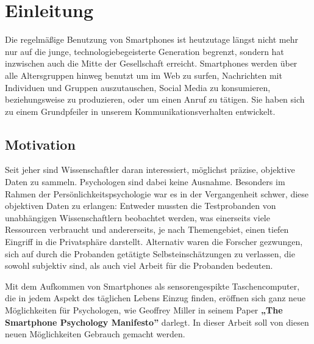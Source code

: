
\chapter{Einleitung}
\label{ch:Einleitung}

Die regelmäßige Benutzung von Smartphones ist heutzutage längst nicht mehr nur auf die junge, technologiebegeisterte Generation begrenzt,
sondern hat inzwischen auch die Mitte der Gesellschaft erreicht\cite{smartphonealter}.
Smartphones werden über alle Altersgruppen hinweg benutzt um im Web zu surfen, Nachrichten mit Individuen und Gruppen auszutauschen, Social Media zu konsumieren, beziehungsweise zu produzieren, oder um einen Anruf zu tätigen.
Sie haben sich zu einem Grundpfeiler in unserem Kommunikationsverhalten entwickelt.

\par



\section{Motivation}

Seit jeher sind Wissenschaftler daran interessiert, möglichst präzise, objektive Daten zu sammeln.
Psychologen sind dabei keine Ausnahme.
Besonders im Rahmen der Persönlichkeitspsychologie war es in der Vergangenheit schwer, diese objektiven Daten zu erlangen:
Entweder mussten die Testprobanden von unabhängigen Wissenschaftlern beobachtet werden,
was einerseits viele Ressourcen verbraucht und andererseits, je nach Themengebiet,
einen tiefen Eingriff in die Privatsphäre darstellt. Alternativ waren die Forscher gezwungen,
sich auf durch die Probanden getätigte Selbsteinschätzungen zu verlassen,
die sowohl subjektiv sind, als auch viel Arbeit für die Probanden bedeuten. %
\par
Mit dem Aufkommen von Smartphones als sensorengespikte Taschencomputer, die in jedem Aspekt des täglichen Lebens Einzug finden,
eröffnen sich ganz neue Möglichkeiten für Psychologen, wie Geoffrey Miller in seinem Paper \textbf{„The Smartphone Psychology Manifesto”} \cite{miller2012smartphone}
darlegt. In dieser Arbeit soll von diesen neuen Möglichkeiten Gebrauch gemacht werden.\par




